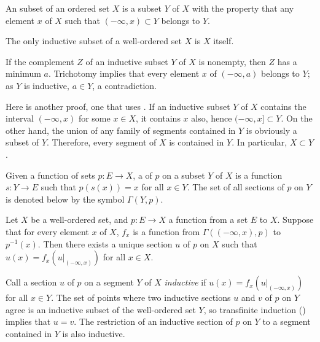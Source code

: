 \documentclass{article}
\begin{document}
An  subset of an ordered set \(X\) is a subset
\(Y\) of \(X\) with the property that any element \(x\) of \(X\) such
that \((-\infty, x) \subset Y\) belongs to \(Y\).

\begin{theorem}
  \label{thm:5vxgawq0}
  The only inductive subset of a well-ordered set \(X\) is \(X\)
  itself.
\end{theorem}

If the complement \(Z\) of an inductive subset \(Y\) of \(X\) is
nonempty, then \(Z\) has a minimum \(a\).  Trichotomy implies that
every element \(x\) of \((-\infty, a)\) belongs to \(Y\); as \(Y\) is
inductive, \(a \in Y\), a contradiction.

Here is another proof, one that uses .  If an
inductive subset \(Y\) of \(X\) contains the interval \((-\infty, x)\)
for some \(x \in X\), it contains \(x\) also, hence
\((-\infty, x] \subset Y\).  On the other hand, the union of any
family of segments contained in \(Y\) is obviously a subset of \(Y\).
Therefore, every segment of \(X\) is contained in \(Y\).  In
particular, \(X \subset Y\).

Given a function of sets \(p : E \to X\), a  of
\(p\) on a subset \(Y\) of \(X\) is a function \(s : Y \to E\) such
that \(p(s(x)) = x\) for all \(x \in Y\).  The set of all sections of
\(p\) on \(Y\) is denoted below by the symbol \(\Gamma(Y, p)\).

\begin{theorem}
  \label{thm:srxrngd8}
  Let \(X\) be a well-ordered set, and \(p : E \to X\) a function from
  a set \(E\) to \(X\).  Suppose that for every element \(x\) of
  \(X\), \(f_x\) is a function from \(\Gamma((-\infty, x), p)\) to
  \(p^{-1}(x)\).  Then there exists a unique section \(u\) of \(p\) on
  \(X\) such that \(u(x) = f_x(u \vert_{(-\infty, x)})\) for all
  \(x \in X\).
\end{theorem}

Call a section \(u\) of \(p\) on a segment \(Y\) of \(X\)
\emph{inductive} if \(u(x) = f_x(u \vert_{(-\infty, x)})\) for all
\(x \in Y\).  The set of points where two inductive sections \(u\) and
\(v\) of \(p\) on \(Y\) agree is an inductive subset of the
well-ordered set \(Y\), so transfinite induction ()
implies that \(u = v\).  The restriction of an inductive section of
\(p\) on \(Y\) to a segment contained in \(Y\) is also inductive.
\end{document}
